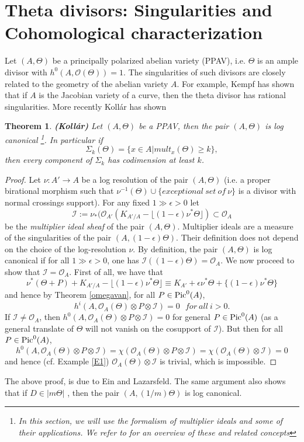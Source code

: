 \documentclass[10pt]{amsart}
\newtheorem{thm}{Theorem}[section]
\newcommand\Pic{{\text{\rm Pic}}}
\newcommand\lra{\longrightarrow}
\newcommand\ot{{\otimes}}
\newcommand\OO{{\mathcal{O}}}
\newcommand\II{{\mathcal{I}}}
\begin{document}
\section{Theta divisors: Singularities and Cohomological characterization}
Let $(A,\Theta )$ be a principally polarized abelian variety
(PPAV), i.e. $\Theta$ is an ample divisor with $h^0(A,\OO (\Theta ))=1$.
The singularities of such divisors are closely related to the geometry
of the abelian variety $A$. For example, Kempf has shown that if
$A$ is the Jacobian variety of a curve, then the theta divisor has rational
singularities. More recently Koll\'ar has shown
\begin{thm} \label{K1}
{\bf (Koll\'ar)} \cite{Ko3}
Let $(A,\Theta )$ be a PPAV, then the pair 
$(A,\Theta )$ is log canonical
\footnote{In this section, we will use the formalism of multiplier ideals
and some of their applications. We refer to \cite{Ein} for an overview of
these and related concepts}. In particular if
$$\Sigma _k(\Theta )=\{ x\in A| mult _x(\Theta )\geq k \},$$
then every component of $\Sigma _k$ has codimension at least $k$. 
\end{thm}
\begin{proof}
Let $\nu :A'\lra A$ be a log resolution of the pair $(A,\Theta
)$ (i.e. a proper birational morphism such that $\nu ^{-1}(\Theta)\cup
\{ exceptional\ set\ of\ \nu \}$ is a divisor with normal crossings support).
For any fixed $1\gg \epsilon >0$ let $$\II :=\nu _*(\OO _{A'}(K_{A'/A}-
\lfloor (1-\epsilon)\nu ^* \Theta \rfloor ) \subset \OO _A$$
be the {\it multiplier ideal sheaf} of the pair $(A,\Theta)$.
Multiplier ideals are a measure of the singularities of the pair
$(A,(1-\epsilon)\Theta )$. Their definition does not depend on the choice
of the log-resolution $\nu$.
By definition, the pair $(A,\Theta )$ is log canonical if for all $1\gg
\epsilon > 0$, one has $\II ((1-\epsilon)\Theta )=\OO _A$.
We now proceed to show that $\II =\OO _A$. 
First of all, we have that
$$\nu ^* (\Theta +P) +K_{A'/A}  -
\lfloor (1-\epsilon)\nu ^* \Theta \rfloor \equiv
K_{A'}+\epsilon \nu ^* \Theta +\{(1-\epsilon) \nu ^* \Theta \}$$
and hence by Theorem \ref{omegavan}, for all $P\in \Pic ^0(A)$,
$$h^i(A, \OO _A(\Theta )\ot P \ot \II )=0\ \ \ for\ all\ i>0.$$
If $\II \ne \OO _A$, then $h^0(A, \OO _A(\Theta )\ot P \ot \II )=0$
for general $P\in \Pic ^0(A)$ (as a general translate of $\Theta$ will
not vanish on the cosupport of $\II$).
But then for all $P\in \Pic ^0(A)$,
$$h^0(A, \OO _A(\Theta )\ot P \ot \II )=
\chi (\OO _A(\Theta )\ot P \ot \II )=\chi (\OO _A(\Theta )\ot \II )=0$$
and hence (cf. Example \ref{E1}) 
$\OO _A(\Theta )\ot \II$ is trivial, 
which is impossible.
\end{proof}
The above proof, is due to Ein and Lazarsfeld. 
The same argument also shows that if $D\in |m\Theta |$ ,
then the pair $(A,(1/m)\Theta )$ is log canonical. 
\end{document}
